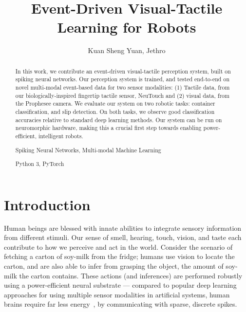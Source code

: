 \documentclass[fyp]{socreport}
\begin{document}
\author{Kuan Sheng Yuan, Jethro}
\title{Event-Driven Visual-Tactile Learning for Robots}

\maketitle

\begin{abstract}
  In this work, we contribute an event-driven visual-tactile perception system,
  built on spiking neural networks. Our perception system is trained, and tested
  end-to-end on novel multi-modal event-based data for two sensor modalities:
  (1) Tactile data, from our biologically-inspired fingertip tactile sensor,
  NeuTouch and (2) visual data, from the Prophesee camera. We evaluate our
  system on two robotic tasks: container classification, and slip detection. On
  both tasks, we observe good classification accuracies relative to standard
  deep learning methods. Our system can be run on neuromorphic hardware, making
  this a crucial first step towards enabling power-efficient, intelligent
  robots.

  \begin{keywords}
    Spiking Neural Networks, Multi-modal Machine Learning
  \end{keywords}

  \begin{implement} Python 3, PyTorch
  \end{implement}
\end{abstract}

\listoffigures
\listoftables
\tableofcontents

\chapter{Introduction\label{cha:intro}}

Human beings are blessed with innate abilities to integrate sensory information
from different stimuli. Our sense of smell, hearing, touch, vision, and taste
each contribute to how we perceive and act in the world. Consider the scenario
of fetching a carton of soy-milk from the fridge; humans use vision to locate
the carton, and are also able to infer from grasping the object, the amount of
soy-milk the carton contains. These actions (and inferences) are performed
robustly using a power-efficient neural substrate --- compared to popular deep
learning approaches for using multiple sensor modalities in artificial systems,
human brains require far less energy~\cite{li2016energyefficiency}, by
communicating with sparse, discrete spikes.
\end{document}
